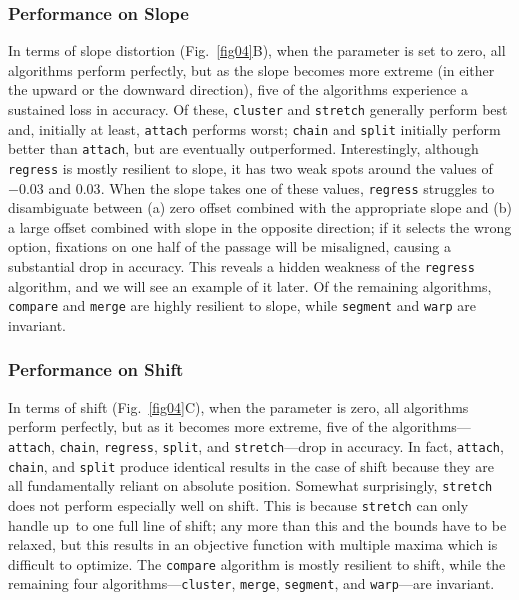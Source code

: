 \documentclass[doc,biblatex]{apa7}
\begin{document}
\subsubsection{Performance on Slope}

In terms of slope distortion (Fig.~\ref{fig04}B), when the parameter is set to zero, all algorithms perform perfectly, but as the slope becomes more extreme (in either the upward or the downward direction), five of the algorithms experience a sustained loss in accuracy. Of these, \texttt{cluster} and \texttt{stretch} generally perform best and, initially at least, \texttt{attach} performs worst; \texttt{chain} and \texttt{split} initially perform better than \texttt{attach}, but are eventually outperformed. Interestingly, although \texttt{regress} is mostly resilient to slope, it has two weak spots around the values of $-0.03$ and $0.03$. When the slope takes one of these values, \texttt{regress} struggles to disambiguate between (a) zero offset combined with the appropriate slope and (b) a large offset combined with slope in the opposite direction; if it selects the wrong option, fixations on one half of the passage will be misaligned, causing a substantial drop in accuracy. This reveals a hidden weakness of the \texttt{regress} algorithm, and we will see an example of it later. Of the remaining algorithms, \texttt{compare} and \texttt{merge} are highly resilient to slope, while \texttt{segment} and \texttt{warp} are invariant.

\subsubsection{Performance on Shift}

In terms of shift (Fig.~\ref{fig04}C), when the parameter is zero, all algorithms perform perfectly, but as it becomes more extreme, five of the algorithms---\texttt{attach}, \texttt{chain}, \texttt{regress}, \texttt{split}, and \texttt{stretch}---drop in accuracy. In fact, \texttt{attach}, \texttt{chain}, and \texttt{split} produce identical results in the case of shift because they are all fundamentally reliant on absolute position. Somewhat surprisingly, \texttt{stretch} does not perform especially well on shift. This is because \texttt{stretch} can only handle up~to one full line of shift; any more than this and the bounds have to be relaxed, but this results in an objective function with multiple maxima which is difficult to optimize. The \texttt{compare} algorithm is mostly resilient to shift, while the remaining four algorithms---\texttt{cluster}, \texttt{merge}, \texttt{segment}, and \texttt{warp}---are invariant.
\end{document}
